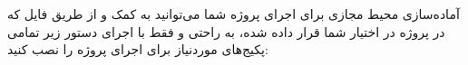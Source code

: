 \Section
{آماده‌سازی محیط مجازی برای اجرای پروژه}
{
شما می‌توانید به کمک  و از طریق فایل  که در  پروژه در اختیار شما قرار داده شده، به راحتی و فقط با اجرای دستور زیر تمامی پکیج‌های موردنیاز برای اجرای پروژه را نصب کنید:
}